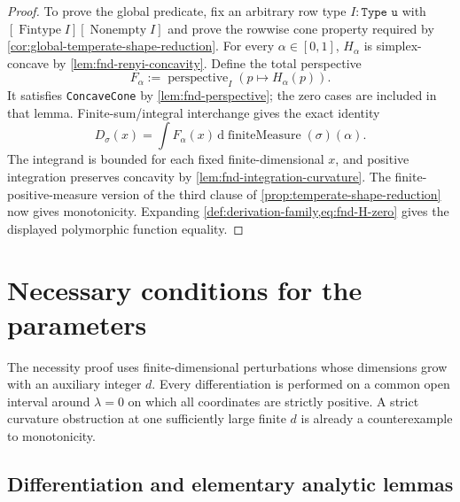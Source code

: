 \documentclass[9pt]{extarticle}
\theoremstyle{definition}
\theoremstyle{remark}
\newcommand{\dd}{\,\mathrm d}
\begin{document}
\begin{proof}
To prove the global predicate, fix an arbitrary row type
$I:\texttt{Type u}$ with
$[\operatorname{Fintype}I][\operatorname{Nonempty}I]$ and prove the
rowwise cone property required by
\cref{cor:global-temperate-shape-reduction}.
For every $\alpha\in[0,1]$, $H_\alpha$ is simplex-concave by
\cref{lem:fnd-renyi-concavity}.  Define the total perspective
\[
 F_\alpha:=\operatorname{perspective}_I(p\mapsto H_\alpha(p)).
\]
It satisfies \texttt{ConcaveCone} by \cref{lem:fnd-perspective}; the zero cases are included in
that lemma.  Finite-sum/integral interchange gives the exact identity
\[
 D_\sigma(x)=\int F_\alpha(x)\dd\operatorname{finiteMeasure}(\sigma)(\alpha).
\]
The integrand is bounded for each fixed finite-dimensional $x$, and positive
integration preserves concavity by \cref{lem:fnd-integration-curvature}.
The finite-positive-measure version of the third clause of
\cref{prop:temperate-shape-reduction} now gives monotonicity.  Expanding
\cref{def:derivation-family,eq:fnd-H-zero} gives the displayed polymorphic
function equality.
\end{proof}

\section{Necessary conditions for the parameters}
\label{sec:necessity}

The necessity proof uses finite-dimensional perturbations whose dimensions
grow with an auxiliary integer $d$. Every differentiation is performed on a
common open interval around $\lambda=0$ on which all coordinates are strictly
positive. A strict curvature obstruction at one sufficiently large finite
$d$ is already a counterexample to monotonicity.

\subsection{Differentiation and elementary analytic lemmas}
\end{document}
